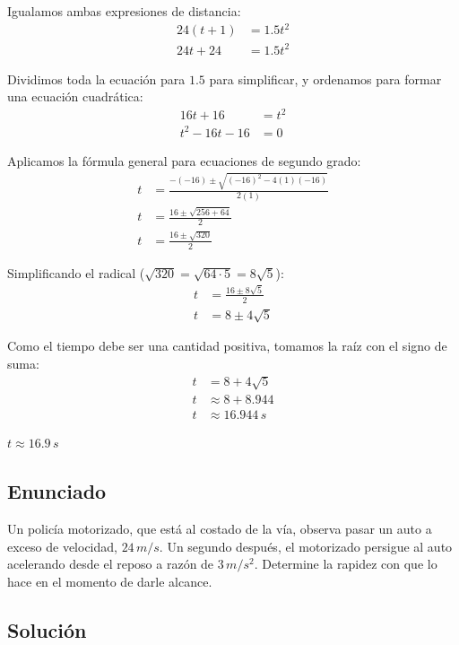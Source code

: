 \documentclass[12pt, a4paper]{article}
\begin{document}
Igualamos ambas expresiones de distancia:
\begin{align*}
24(t + 1) &= 1.5 t^2 \\
24t + 24 &= 1.5 t^2
\end{align*}

Dividimos toda la ecuación para $1.5$ para simplificar, y ordenamos para formar una ecuación cuadrática:
\begin{align*}
16t + 16 &= t^2 \\
t^2 - 16t - 16 &= 0
\end{align*}

Aplicamos la fórmula general para ecuaciones de segundo grado:
\begin{align*}
t &= \frac{-(-16) \pm \sqrt{(-16)^2 - 4(1)(-16)}}{2(1)} \\
t &= \frac{16 \pm \sqrt{256 + 64}}{2} \\
t &= \frac{16 \pm \sqrt{320}}{2}
\end{align*}

Simplificando el radical ($\sqrt{320} = \sqrt{64 \cdot 5} = 8\sqrt{5}$):
\begin{align*}
t &= \frac{16 \pm 8\sqrt{5}}{2} \\
t &= 8 \pm 4\sqrt{5}
\end{align*}

Como el tiempo debe ser una cantidad positiva, tomamos la raíz con el signo de suma:
\begin{align*}
t &= 8 + 4\sqrt{5} \\
t &\approx 8 + 8.944 \\
t &\approx 16.944 \, \si{s}
\end{align*}

\begin{tcolorbox}[colback=green!5!white, colframe=green!50!black, title=Respuesta Final]
\centering \Large $t \approx 16.9 \, \si{s}$
\end{tcolorbox}

\newpage

\subsection*{Enunciado}
Un policía motorizado, que está al costado de la vía, observa pasar un auto a exceso de velocidad, $24 \, \si{m/s}$. Un segundo después, el motorizado persigue al auto acelerando desde el reposo a razón de $3 \, \si{m/s^2}$. Determine la rapidez con que lo hace en el momento de darle alcance.

\subsection*{Solución}
\end{document}
